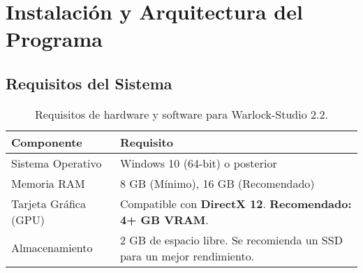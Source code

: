 \documentclass[11pt, a4paper]{article}
\begin{document}
\section{Instalación y Arquitectura del Programa}

\subsection{Requisitos del Sistema}
\begin{table}[H]
    \centering %
    \begin{tabular}{ll}
        \toprule %
        \textbf{Componente} & \textbf{Requisito} \\
        \midrule %
        Sistema Operativo & Windows 10 (64-bit) o posterior \\
        Memoria RAM & 8 GB (Mínimo), 16 GB (Recomendado) \\
        Tarjeta Gráfica (GPU) & Compatible con \textbf{DirectX 12}. \textbf{Recomendado: 4+ GB VRAM}. \\
        Almacenamiento & 2 GB de espacio libre. Se recomienda un SSD para un mejor rendimiento. \\
        \bottomrule %
    \end{tabular}
    \caption{Requisitos de hardware y software para Warlock-Studio 2.2.}
\end{table}
\end{document}
